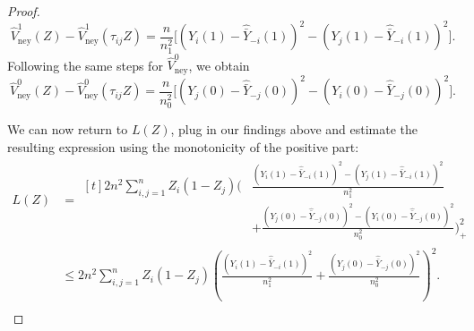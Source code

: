 \documentclass[10pt,a4paper]{amsart}
\newcommand{\vhn}{\hat{V}_{\mathrm{ney}}}
\newcommand{\ybh}{\hat{\bar{Y}}}
\newcommand{\yb}{\bar{Y}}
\begin{document}
\begin{proof}
\begin{equation*}
        \vhn^1(Z) - \vhn^1(\tau_{ij}Z) = \frac{n}{n_1^2}\Big[(Y_i(1)-\ybh_{-i}(1))^2-(Y_j(1)-\ybh_{-i}(1))^2\Big].
    \end{equation*}
    Following the same steps for $\vhn^0$, we obtain
    \begin{equation*}
        \vhn^0(Z) - \vhn^0(\tau_{ij}Z) = \frac{n}{n_0^2}\Big[(Y_j(0)-\ybh_{-j}(0))^2-(Y_i(0)-\ybh_{-j}(0))^2\Big].
    \end{equation*}

    We can now return to $L(Z)$, plug in our findings above and estimate the resulting expression using the monotonicity of the positive part:
    \begin{align*}
        L(Z) &= \begin{aligned}[t]
            2 n^2 \sum_{i,j=1}^n Z_i (1-Z_j) \bigg(&\frac{(Y_i(1)-\ybh_{-i}(1))^2-(Y_j(1)-\ybh_{-i}(1))^2}{n_1^2}\\
            &+ \frac{(Y_j(0)-\ybh_{-j}(0))^2-(Y_i(0)-\ybh_{-j}(0))^2}{n_0^2}\bigg)_+^2
        \end{aligned}\\[1ex]
        &\leq 2 n^2 \sum_{i,j=1}^n Z_i (1-Z_j) \left(\frac{(Y_i(1)-\ybh_{-i}(1))^2}{n_1^2}
            + \frac{(Y_j(0)-\ybh_{-j}(0))^2}{n_0^2}\right)^2.\\
    \end{align*}
     

\end{proof}
\end{document}
